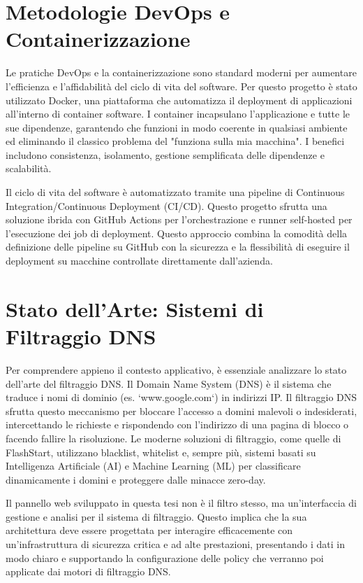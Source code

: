 \documentclass[12pt,a4paper,openright,twoside]{book}
\begin{document}
\section{Metodologie DevOps e Containerizzazione}
\label{sec:devops}

Le pratiche DevOps e la containerizzazione sono standard moderni per aumentare l'efficienza e l'affidabilità del ciclo di vita del software.  Per questo progetto è stato utilizzato Docker, una piattaforma che automatizza il deployment di applicazioni all'interno di container software.  I container incapsulano l'applicazione e tutte le sue dipendenze, garantendo che funzioni in modo coerente in qualsiasi ambiente ed eliminando il classico problema del "funziona sulla mia macchina".  I benefici includono consistenza, isolamento, gestione semplificata delle dipendenze e scalabilità. 

Il ciclo di vita del software è automatizzato tramite una pipeline di Continuous Integration/Continuous Deployment (CI/CD).  Questo progetto sfrutta una soluzione ibrida con GitHub Actions per l'orchestrazione e runner self-hosted per l'esecuzione dei job di deployment.  Questo approccio combina la comodità della definizione delle pipeline su GitHub con la sicurezza e la flessibilità di eseguire il deployment su macchine controllate direttamente dall'azienda. 

\section{Stato dell'Arte: Sistemi di Filtraggio DNS}
\label{sec:dns_filtering}

Per comprendere appieno il contesto applicativo, è essenziale analizzare lo stato dell'arte del filtraggio DNS. Il Domain Name System (DNS) è il sistema che traduce i nomi di dominio (es. `www.google.com`) in indirizzi IP.  Il filtraggio DNS sfrutta questo meccanismo per bloccare l'accesso a domini malevoli o indesiderati, intercettando le richieste e rispondendo con l'indirizzo di una pagina di blocco o facendo fallire la risoluzione.  Le moderne soluzioni di filtraggio, come quelle di FlashStart, utilizzano blacklist, whitelist e, sempre più, sistemi basati su Intelligenza Artificiale (AI) e Machine Learning (ML) per classificare dinamicamente i domini e proteggere dalle minacce zero-day. 

Il pannello web sviluppato in questa tesi non è il filtro stesso, ma un'interfaccia di gestione e analisi per il sistema di filtraggio.  Questo implica che la sua architettura deve essere progettata per interagire efficacemente con un'infrastruttura di sicurezza critica e ad alte prestazioni, presentando i dati in modo chiaro e supportando la configurazione delle policy che verranno poi applicate dai motori di filtraggio DNS.
\end{document}
